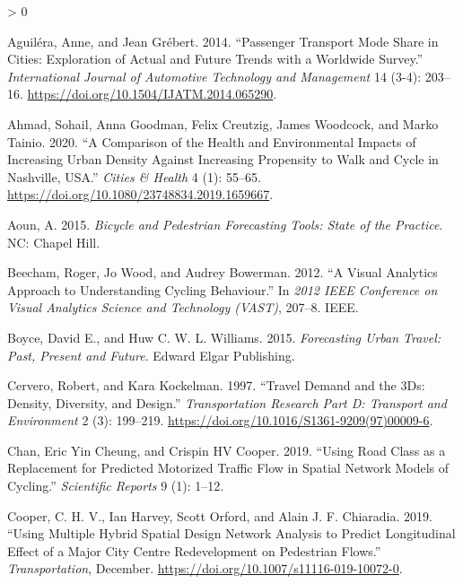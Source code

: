 \documentclass[galley]{jtlu-article-2col}
\newlength{\cslhangindent}
\newenvironment{CSLReferences}[2] %
 {%
  \setlength{\parindent}{0pt}
  \ifodd #1 \everypar{\setlength{\hangindent}{\cslhangindent}}\ignorespaces\fi
  \ifnum #2 > 0
  \setlength{\parskip}{#2\baselineskip}
  \fi
 }%
 {}
\begin{document}
\hypertarget{refs}{}
\begin{CSLReferences}{1}{0}
\leavevmode\hypertarget{ref-aguilera_passenger_2014}{}%
Aguiléra, Anne, and Jean Grébert. 2014. {``Passenger Transport Mode Share in Cities: Exploration of Actual and Future Trends with a Worldwide Survey.''} \emph{International Journal of Automotive Technology and Management} 14 (3-4): 203--16. \url{https://doi.org/10.1504/IJATM.2014.065290}.

\leavevmode\hypertarget{ref-ahmad_comparison_2020}{}%
Ahmad, Sohail, Anna Goodman, Felix Creutzig, James Woodcock, and Marko Tainio. 2020. {``A Comparison of the Health and Environmental Impacts of Increasing Urban Density Against Increasing Propensity to Walk and Cycle in {Nashville}, {USA}.''} \emph{Cities \& Health} 4 (1): 55--65. \url{https://doi.org/10.1080/23748834.2019.1659667}.

\leavevmode\hypertarget{ref-aoun_bicycle_2015}{}%
Aoun, A. 2015. \emph{Bicycle and Pedestrian Forecasting Tools: {State} of the Practice}. {NC}: {Chapel Hill}.

\leavevmode\hypertarget{ref-beecham_visual_2012}{}%
Beecham, Roger, Jo Wood, and Audrey Bowerman. 2012. {``A Visual Analytics Approach to Understanding Cycling Behaviour.''} In \emph{2012 {IEEE Conference} on {Visual Analytics Science} and {Technology} ({VAST})}, 207--8. {IEEE}.

\leavevmode\hypertarget{ref-boyce_forecasting_2015}{}%
Boyce, David E., and Huw C. W. L. Williams. 2015. \emph{Forecasting {Urban Travel}: {Past}, {Present} and {Future}}. {Edward Elgar Publishing}.

\leavevmode\hypertarget{ref-cervero_travel_1997}{}%
Cervero, Robert, and Kara Kockelman. 1997. {``Travel Demand and the {3Ds}: {Density}, Diversity, and Design.''} \emph{Transportation Research Part D: Transport and Environment} 2 (3): 199--219. \url{https://doi.org/10.1016/S1361-9209(97)00009-6}.

\leavevmode\hypertarget{ref-chan_using_2019}{}%
Chan, Eric Yin Cheung, and Crispin HV Cooper. 2019. {``Using Road Class as a Replacement for Predicted Motorized Traffic Flow in Spatial Network Models of Cycling.''} \emph{Scientific Reports} 9 (1): 1--12.

\leavevmode\hypertarget{ref-cooper_using_2019}{}%
Cooper, C. H. V., Ian Harvey, Scott Orford, and Alain J. F. Chiaradia. 2019. {``Using Multiple Hybrid Spatial Design Network Analysis to Predict Longitudinal Effect of a Major City Centre Redevelopment on Pedestrian Flows.''} \emph{Transportation}, December. \url{https://doi.org/10.1007/s11116-019-10072-0}.


\end{CSLReferences}
\end{document}
